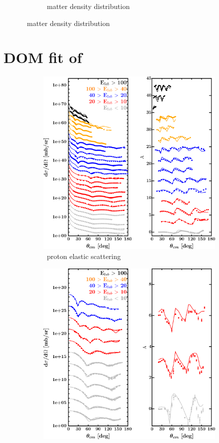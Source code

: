 \begin{figure}[hbtp]
\begin{subfigure}{0.70\textwidth}
        \caption{\caEight\ matter density distribution}
        \label{DOMFitData_ca48_matterDensity}
    \end{subfigure}
\end{figure}

\newpage
\section{DOM fit of \niEight}
\label{ni58DOMOutput}
\begin{figure}[hbtp]
    \captionsetup[subfigure]{labelformat=empty}
    \centering
    \begin{subfigure}[c]{0.39\textheight}
        \centering
        \includegraphics[width=\linewidth]{figures/ni58_protonElastic.png}
        \caption{\niEight\ proton elastic scattering}
        \label{DOMFitData_ni58_proton_elastic}
    \end{subfigure}\hspace{6pt}
    \begin{subfigure}[c]{0.39\textheight}
        \centering
        \includegraphics[width=0.52\linewidth]{figures/ni58_neutronElastic.png}

\end{subfigure}
\end{figure}
